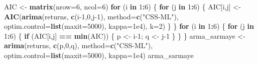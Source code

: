 \documentclass[
  11pt,
]{article}
\newenvironment{Shaded}{\begin{snugshade}}{\end{snugshade}}
\newcommand{\AttributeTok}[1]{\textcolor[rgb]{0.13,0.29,0.53}{#1}}
\newcommand{\ControlFlowTok}[1]{\textcolor[rgb]{0.13,0.29,0.53}{\textbf{#1}}}
\newcommand{\DecValTok}[1]{\textcolor[rgb]{0.00,0.00,0.81}{#1}}
\newcommand{\FloatTok}[1]{\textcolor[rgb]{0.00,0.00,0.81}{#1}}
\newcommand{\FunctionTok}[1]{\textcolor[rgb]{0.13,0.29,0.53}{\textbf{#1}}}
\newcommand{\NormalTok}[1]{#1}
\newcommand{\OtherTok}[1]{\textcolor[rgb]{0.56,0.35,0.01}{#1}}
\newcommand{\SpecialCharTok}[1]{\textcolor[rgb]{0.81,0.36,0.00}{\textbf{#1}}}
\newcommand{\StringTok}[1]{\textcolor[rgb]{0.31,0.60,0.02}{#1}}
\begin{document}
\begin{Shaded}
\begin{Highlighting}[]
\NormalTok{AIC }\OtherTok{\textless{}{-}} \FunctionTok{matrix}\NormalTok{(}\AttributeTok{nrow=}\DecValTok{6}\NormalTok{, }\AttributeTok{ncol=}\DecValTok{6}\NormalTok{)}
\ControlFlowTok{for}\NormalTok{ (i }\ControlFlowTok{in} \DecValTok{1}\SpecialCharTok{:}\DecValTok{6}\NormalTok{) \{}
  \ControlFlowTok{for}\NormalTok{ (j }\ControlFlowTok{in} \DecValTok{1}\SpecialCharTok{:}\DecValTok{6}\NormalTok{) \{}
\NormalTok{    AIC[i,j] }\OtherTok{\textless{}{-}} \FunctionTok{AIC}\NormalTok{(}\FunctionTok{arima}\NormalTok{(returns, }\FunctionTok{c}\NormalTok{(i}\DecValTok{{-}1}\NormalTok{,}\DecValTok{0}\NormalTok{,j}\DecValTok{{-}1}\NormalTok{), }\AttributeTok{method=}\FunctionTok{c}\NormalTok{(}\StringTok{"CSS{-}ML"}\NormalTok{),}
                          \AttributeTok{optim.control=}\FunctionTok{list}\NormalTok{(}\AttributeTok{maxit=}\DecValTok{5000}\NormalTok{), }\AttributeTok{kappa=}\FloatTok{1e4}\NormalTok{), }\AttributeTok{k=}\DecValTok{2}\NormalTok{)}
\NormalTok{  \}}
\NormalTok{\}}
\ControlFlowTok{for}\NormalTok{ (i }\ControlFlowTok{in} \DecValTok{1}\SpecialCharTok{:}\DecValTok{6}\NormalTok{) \{}
  \ControlFlowTok{for}\NormalTok{ (j }\ControlFlowTok{in} \DecValTok{1}\SpecialCharTok{:}\DecValTok{6}\NormalTok{) \{}
    \ControlFlowTok{if}\NormalTok{ (AIC[i,j] }\SpecialCharTok{==} \FunctionTok{min}\NormalTok{(AIC)) \{ p }\OtherTok{\textless{}{-}}\NormalTok{ i}\DecValTok{{-}1}\NormalTok{; q }\OtherTok{\textless{}{-}}\NormalTok{ j}\DecValTok{{-}1}\NormalTok{ \}}
\NormalTok{  \}}
\NormalTok{\}}
\NormalTok{arma\_sarmaye }\OtherTok{\textless{}{-}} \FunctionTok{arima}\NormalTok{(returns, }\FunctionTok{c}\NormalTok{(p,}\DecValTok{0}\NormalTok{,q), }\AttributeTok{method=}\FunctionTok{c}\NormalTok{(}\StringTok{"CSS{-}ML"}\NormalTok{),}
                      \AttributeTok{optim.control=}\FunctionTok{list}\NormalTok{(}\AttributeTok{maxit=}\DecValTok{5000}\NormalTok{), }\AttributeTok{kappa=}\FloatTok{1e4}\NormalTok{)}
\NormalTok{arma\_sarmaye}


\end{Highlighting}
\end{Shaded}
\end{document}
